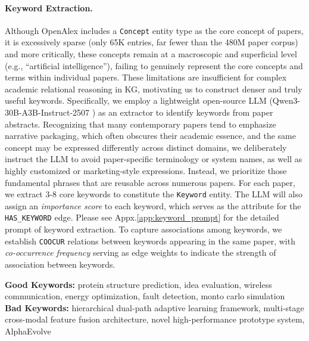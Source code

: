 \paragraph{Keyword Extraction.}
Although OpenAlex includes a \texttt{Concept} entity type as the core concept of papers, it is excessively sparse (only 65K entries, far fewer than the 480M paper corpus) and more critically, these concepts remain at a macroscopic and superficial level (e.g., ``artificial intelligence''), failing to genuinely represent the core concepts and terms within individual papers.
These limitations are insufficient for complex academic relational reasoning in KG, motivating us to construct denser and truly useful keywords.
Specifically, we employ a lightweight open-source LLM (Qwen3-30B-A3B-Instruct-2507 \citep{qwen3}) as an extractor to identify keywords from paper abstracts.
Recognizing that many contemporary papers tend to emphasize narrative packaging, which often obscures their academic essence, and the same concept may be expressed differently across distinct domains, we deliberately instruct the LLM to avoid paper-specific terminology or system names, as well as highly customized or marketing-style expressions.
Instead, we prioritize those fundamental phrases that are reusable across numerous papers.
For each paper, we extract 3-8 core keywords to constitute the \texttt{Keyword} entity.
The LLM will also assign an \textit{importance score} to each keyword, which serves as the attribute for the \texttt{HAS\_KEYWORD} edge.
Please see Appx.\ref{app:keyword_prompt} for the detailed prompt of keyword extraction.
To capture associations among keywords, we establish \texttt{COOCUR} relations between keywords appearing in the same paper, with \textit{co-occurrence frequency} serving as edge weights to indicate the strength of association between keywords.

\begin{tcolorbox}[breakable,colback=persona!20!white, colframe=persona!60!black, title=\textbf{Examples of Good and Bad Keywords}]
    \label{good_bad_keywords}
    \textbf{Good Keywords:} protein structure prediction, idea evaluation, wireless communication, energy optimization, fault detection, monto carlo simulation\\
    
    \textbf{Bad Keywords:} hierarchical dual-path adaptive learning framework, multi-stage cross-modal feature fusion architecture, novel high-performance prototype system, AlphaEvolve
\end{tcolorbox}

